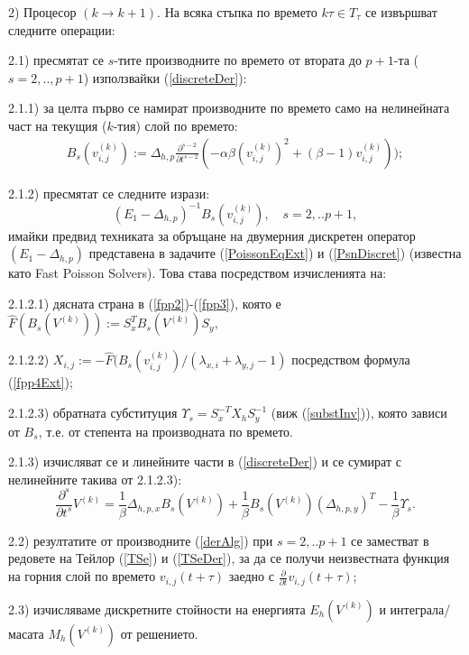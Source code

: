 \documentclass[a4paper]{article}
\newcommand{\be}{\begin{equation}}
\newcommand{\ee}{\end{equation}}
\newcommand{\rf}[1]{(\ref{#1})}
\theoremstyle{remark}
\begin{document}
\begin{large}
2) Процесор $(k \rightarrow k+1)$. На всяка стъпка по времето $k\tau \in T_\tau$ се извършват следните операции:
\par
2.1) пресмятат се $s$-тите производните по времето от втората до $p+1$-та ($s=2,..,p+1$) използвайки \rf{discreteDer}:
\par
2.1.1) за целта първо се намират производните по времето само на нелинейната част на текущия ($k$-тия) слой по времето:
\begin{align*}
B_{s}(v_{i,j}^{(k)}) := \Delta_{h,p} \frac{\partial^{s-2}}{\partial t^{s-2}} (-\alpha \beta (v_{i,j}^{(k)} )^2  + (\beta-1) v_{i,j}^{(k)} ) );
\end{align*}
\par
2.1.2) пресмятат се следните изрази:
\be\label{rightSide}
(E_1 - \Delta_{h,p})^{-1} B_{s}(v_{i,j}^{(k)}), \quad s=2,..p+1,
\ee
имайки предвид техниката за обръщане на двумерния дискретен оператор $(E_1 - \Delta_{h,p})$ представена в задачите \rf{PoissonEqExt} и \rf{PsnDiscret} (известна като Fast Poisson Solvers). Това става посредством изчисленията на:
\par
2.1.2.1) дясната страна в \rf{fpp2}-\rf{fpp3}, която е $\widehat F(B_{s}(V^{(k)})) := S_x^T   B_{s}(V^{(k)})  S_y$,
\par
2.1.2.2) $X_{i,j} := -\widehat F(B_{s}(v_{i,j}^{(k)}) /(\lambda_{x,i} + \lambda_{y,j} - 1)$ посредством формула \rf{fpp4Ext};
\par
2.1.2.3) обратната субституция $\Upsilon_s = S_x^{-T}  X_h  S_y^{-1}$ (виж \rf{substInv}), която зависи от $B_s$, т.е. от степента на производната по времето.
\par
2.1.3) изчисляват се и линейните части в \rf{discreteDer} и се сумират с нелинейните такива от 2.1.2.3):
\begin{equation}\label{derAlg}
\frac{\partial^{s}}{\partial t^{s}}V^{(k)} = \frac{1}{\beta}\Delta_{h,p,x}  B_{s}(V^{(k)}) + \frac{1}{\beta}B_{s}(V^{(k)})  (\Delta_{h,p,y})^T -\frac{1}{\beta}\Upsilon_s.
\end{equation}
\par
2.2) резултатите от производните \rf{derAlg} при $s=2,..p+1$ се заместват в редовете на Тейлор \rf{TSe} и \rf{TSeDer}, за да се получи неизвестната функция на горния слой по времето $v_{i,j}(t+\tau)$ заедно с $ \frac{\partial}{\partial t}v_{i,j}(t+\tau)$;
\par
2.3) изчисляваме дискретните стойности на енергията $E_h(V^{(k)})$ и интеграла/масата $M_h(V^{(k)})$ от решението.
\par


\end{large}
\end{document}

